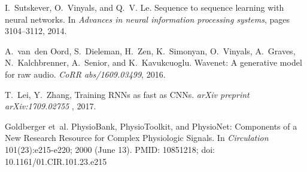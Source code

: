 \documentclass{article}
\begin{document}
\begin{thebibliography}{19}
I.~Sutskever, O.~Vinyals, and Q.~V. Le.
\newblock Sequence to sequence learning with neural networks.
\newblock In \emph{Advances in neural information processing systems}, pages
  3104--3112, 2014.

A.~van~den Oord, S.~Dieleman, H.~Zen, K.~Simonyan, O.~Vinyals, A.~Graves,
  N.~Kalchbrenner, A.~Senior, and K.~Kavukcuoglu.
\newblock Wavenet: A generative model for raw audio.
\newblock \emph{CoRR abs/1609.03499}, 2016.

T.~Lei, Y.~Zhang,
\newblock Training RNNs as fast as CNNs.
\newblock \emph{arXiv preprint arXiv:1709.02755 }, 2017.

 Goldberger et~al.
    \newblock PhysioBank, PhysioToolkit, and PhysioNet:
Components of a New Research Resource for Complex Physiologic
Signals.
\newblock In \emph{Circulation} 101(23):e215-e220; 2000 (June 13). PMID:
10851218; doi: 10.1161/01.CIR.101.23.e215
\end{thebibliography}
\end{document}
